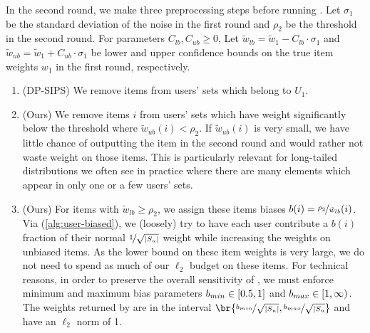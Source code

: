In the second round, we make three preprocessing steps before running \ouralgo{}. Let $\sigma_1$ be the standard deviation of the noise in the first round and $\rho_2$ be the threshold in the second round. For parameters $C_{lb}, C_{ub} \geq 0$, Let $\tilde{w}_{lb} = \tilde{w}_1 - C_{lb} \cdot \sigma_1$ and $\tilde{w}_{ub} = \tilde{w}_1 + C_{ub} \cdot \sigma_1$ be lower and upper confidence bounds on the true item weights $w_1$ in the first round, respectively.
\begin{enumerate}[label=(\alph*)]
    \item (DP-SIPS) We remove items from users' sets which belong to $U_1$.
    \item (Ours) We remove items $i$ from users' sets which have weight significantly below the threshold where $\tilde{w}_{ub}(i) < \rho_2$. If $\tilde{w}_{ub}(i)$ is very small, we have little chance of outputting the item in the second round and would rather not waste weight on those items. This is particularly relevant for long-tailed distributions we often see in practice where there are many elements which appear in only one or a few users' sets.
    \item (Ours) For items with $\tilde{w}_{lb} \geq \rho_2$, we assign these items biases $b(i) = \nicefrac{\rho_2}{\tilde{w}_{lb}}(i)$. Via \userweights{} (\cref{alg:user-biased}), we (loosely) try to have each user contribute a $b(i)$ fraction of their normal $\nicefrac{1}{\sqrt{|S_u|}}$ weight while increasing the weights on unbiased items.
    As the lower bound on these item weights is very large, we do not need to spend as much of our $\ell_2$ budget on these items.
    For technical reasons, in order to preserve the overall sensitivity of \ouralgo{}, we must enforce minimum and maximum bias parameters $b_{min} \in [0.5, 1]$ and $b_{max} \in [1, \infty)$.
    The weights returned by \userweights{} are in the interval $\br{\nicefrac{\bmin}{\sqrt{|S_u|}}, \nicefrac{\bmax}{\sqrt{|S_u}}}$ and have an $\ell_2$ norm of 1.
\end{enumerate}